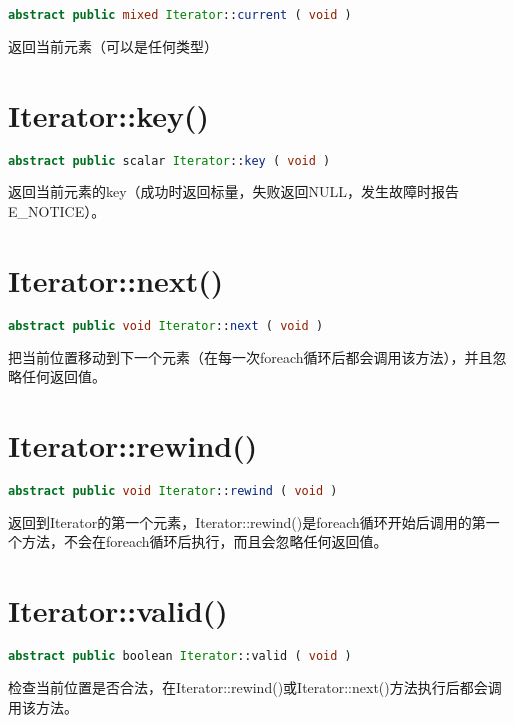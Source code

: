 \begin{lstlisting}[language=PHP]
abstract public mixed Iterator::current ( void )
\end{lstlisting}

返回当前元素（可以是任何类型）

\section{Iterator::key()}

\begin{lstlisting}[language=PHP]
abstract public scalar Iterator::key ( void )
\end{lstlisting}

返回当前元素的key（成功时返回标量，失败返回NULL，发生故障时报告E\_NOTICE）。



\section{Iterator::next()}

\begin{lstlisting}[language=PHP]
abstract public void Iterator::next ( void )
\end{lstlisting}

把当前位置移动到下一个元素（在每一次foreach循环后都会调用该方法），并且忽略任何返回值。

\section{Iterator::rewind()}

\begin{lstlisting}[language=PHP]
abstract public void Iterator::rewind ( void )
\end{lstlisting}

返回到Iterator的第一个元素，Iterator::rewind()是foreach循环开始后调用的第一个方法，不会在foreach循环后执行，而且会忽略任何返回值。



\section{Iterator::valid()}


\begin{lstlisting}[language=PHP]
abstract public boolean Iterator::valid ( void )
\end{lstlisting}

检查当前位置是否合法，在Iterator::rewind()或Iterator::next()方法执行后都会调用该方法。

